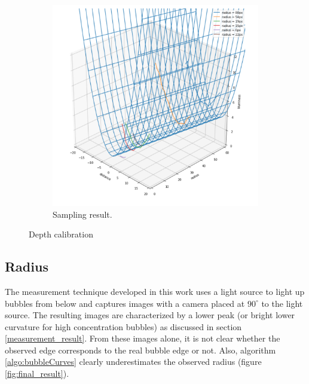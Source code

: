 \begin{figure}
				\begin{subfigure}[t]{.50\textwidth}
						\centering
						\includegraphics[scale=.4]{images/dof_calibration_fit.png}
						\caption{Sampling result. }
						\label{subfig:depth_calib_fit_result}
					\end{subfigure}								
				
				\caption{Depth calibration}
				\label{fig:depth_calib}
			\end{figure}
			
			
			
			
			
		\subsection{Radius}\label{sub:radius_algorithm}
			The measurement technique developed in this work uses a light source to light up bubbles from below and captures images with a camera placed at $90^\circ$ to the light source. The resulting images are characterized by a lower peak (or bright lower curvature for high concentration bubbles) as discussed in section \ref{measurement_result}. From these images alone, it is not clear whether the observed edge corresponds to the real bubble edge or not. Also, algorithm \ref{algo:bubbleCurves} clearly underestimates the observed radius (figure \ref{fig:final_result}). 
			
